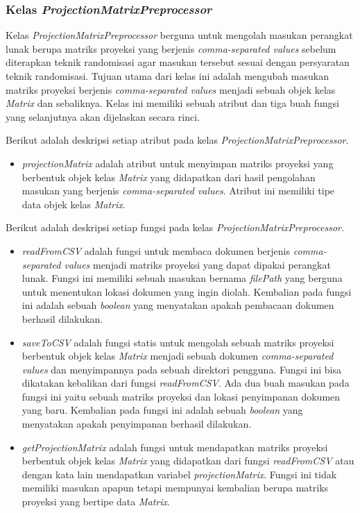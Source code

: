 \subsubsection{Kelas \textit{ProjectionMatrixPreprocessor}}
\label{subsubsec:kelas-projectionpre}

Kelas \textit{ProjectionMatrixPreprocessor} berguna untuk mengolah masukan perangkat lunak berupa matriks proyeksi yang berjenis \textit{comma-separated values} sebelum diterapkan teknik randomisasi agar masukan tersebut sesuai dengan persyaratan teknik randomisasi. Tujuan utama dari kelas ini adalah mengubah masukan matriks proyeksi berjenis \textit{comma-separated values} menjadi sebuah objek kelas \textit{Matrix} dan sebaliknya. Kelas ini memiliki sebuah atribut dan tiga buah fungsi yang selanjutnya akan dijelaskan secara rinci.

Berikut adalah deskripsi setiap atribut pada kelas \textit{ProjectionMatrixPreprocessor}.
\begin{itemize}
	\item \textit{projectionMatrix} adalah atribut untuk menyimpan matriks proyeksi yang berbentuk objek kelas \textit{Matrix} yang didapatkan dari hasil pengolahan masukan yang berjenis \textit{comma-separated values}. Atribut ini memiliki tipe data objek kelas \textit{Matrix}.
\end{itemize}

Berikut adalah deskripsi setiap fungsi pada kelas \textit{ProjectionMatrixPreprocessor}.
\begin{itemize}
	\item \textit{readFromCSV} adalah fungsi untuk membaca dokumen berjenis \textit{comma-separated values} menjadi matriks proyeksi yang dapat dipakai perangkat lunak. Fungsi ini memiliki sebuah masukan bernama \textit{filePath} yang berguna untuk menentukan lokasi dokumen yang ingin diolah. Kembalian pada fungsi ini adalah sebuah \textit{boolean} yang menyatakan apakah pembacaan dokumen berhasil dilakukan.
	\item \textit{saveToCSV} adalah fungsi statis untuk mengolah sebuah matriks proyeksi berbentuk objek kelas \textit{Matrix} menjadi sebuah dokumen \textit{comma-separated values} dan menyimpannya pada sebuah direktori pengguna. Fungsi ini bisa dikatakan kebalikan dari fungsi \textit{readFromCSV}. Ada dua buah masukan pada fungsi ini yaitu sebuah matriks proyeksi dan lokasi penyimpanan dokumen yang baru. Kembalian pada fungsi ini adalah sebuah \textit{boolean} yang menyatakan apakah penyimpanan berhasil dilakukan.
	\item \textit{getProjectionMatrix} adalah fungsi untuk mendapatkan matriks proyeksi berbentuk objek kelas \textit{Matrix} yang didapatkan dari fungsi \textit{readFromCSV} atau dengan kata lain mendapatkan variabel \textit{projectionMatrix}. Fungsi ini tidak memiliki masukan apapun tetapi mempunyai kembalian berupa matriks proyeksi yang bertipe data \textit{Matrix}.
\end{itemize}

